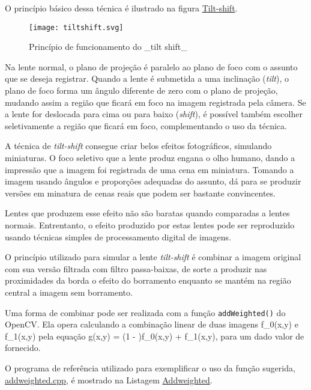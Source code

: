 \documentclass[11pt]{amsbook}
\begin{document}
O princípio básico dessa técnica é ilustrado na figura
\hyperlink{fig-tiltshift}{Tilt-shift}.


\begin{figure}[h]{}
\centering\texttt{[image: tiltshift.svg]}
\caption{Princípio de funcionamento do _tilt shift_}

\end{figure}

Na lente normal, o plano de projeção é paralelo ao plano de foco com o
assunto que se deseja registrar. Quando a lente é submetida a uma
inclinação (\emph{tilt}), o plano de foco forma um ângulo diferente de zero
com o plano de projeção, mudando assim a região que ficará em foco na
imagem registrada pela câmera. Se a lente for deslocada para cima ou
para baixo (\emph{shift}), é possível também escolher seletivamente a
região que ficará em foco, complementando o uso da técnica.


A técnica de \emph{tilt-shift} consegue criar belos efeitos fotográficos,
simulando miniaturas. O foco seletivo que a lente produz engana o olho
humano, dando a impressão que a imagem foi registrada de uma cena em
miniatura. Tomando a imagem usando ângulos e proporções adequadas do
assunto, dá para se produzir versões em minatura de cenas reais que
podem ser bastante convincentes.


Lentes que produzem esse efeito não são baratas quando comparadas a
lentes normais. Entrentanto, o efeito produzido por estas lentes pode
ser reproduzido usando técnicas simples de processamento digital de
imagens.


O princípio utilizado para simular a lente \emph{tilt-shift} é combinar a
imagem original com sua versão filtrada com filtro passa-baixas, de
sorte a produzir nas proximidades da borda o efeito do borramento
enquanto se mantém na região central a imagem sem borramento.


Uma forma de combinar pode ser realizada com a função \texttt{addWeighted()} do
OpenCV. Ela opera calculando a combinação linear de duas imagens
f_0(x,y) e f_1(x,y) pela
equação g(x,y) = (1 - \alpha)f_0(x,y) + \alpha f_1(x,y), para um
dado valor de \alpha fornecido.


O programa de referência utilizado para exemplificar o uso da função sugerida,
\href{exemplos/addweighted.cpp}{addweighted.cpp}, é mostrado na
Listagem \hyperlink{exa-addweighted}{Addweighted}.
\end{document}
